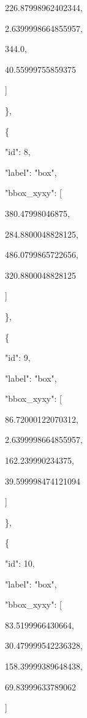\documentclass[10pt,a4paper]{article}
\begin{document}
        226.87998962402344,\allowbreak{}\par
        2.6399998664855957,\allowbreak{}\par
        344.0,\allowbreak{}\par
        40.55999755859375\par
      ]\par
    \},\allowbreak{}\par
    \{\par
      "id":\allowbreak{} 8,\allowbreak{}\par
      "label":\allowbreak{} "box",\allowbreak{}\par
      "bbox\_xyxy":\allowbreak{} [\par
        380.47998046875,\allowbreak{}\par
        284.8800048828125,\allowbreak{}\par
        486.0799865722656,\allowbreak{}\par
        320.8800048828125\par
      ]\par
    \},\allowbreak{}\par
    \{\par
      "id":\allowbreak{} 9,\allowbreak{}\par
      "label":\allowbreak{} "box",\allowbreak{}\par
      "bbox\_xyxy":\allowbreak{} [\par
        86.72000122070312,\allowbreak{}\par
        2.6399998664855957,\allowbreak{}\par
        162.239990234375,\allowbreak{}\par
        39.599998474121094\par
      ]\par
    \},\allowbreak{}\par
    \{\par
      "id":\allowbreak{} 10,\allowbreak{}\par
      "label":\allowbreak{} "box",\allowbreak{}\par
      "bbox\_xyxy":\allowbreak{} [\par
        83.5199966430664,\allowbreak{}\par
        30.479999542236328,\allowbreak{}\par
        158.39999389648438,\allowbreak{}\par
        69.83999633789062\par
      ]\par
\end{document}
